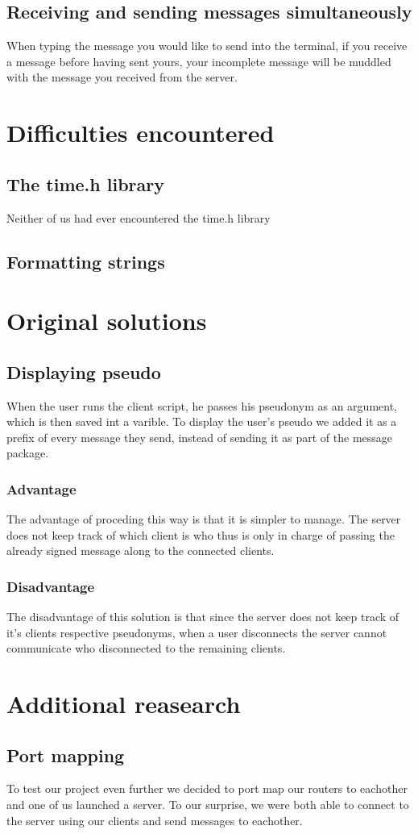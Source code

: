 \documentclass[utf8]{article}
\begin{document}
\subsection{Receiving and sending messages simultaneously}
When typing the message you would like to send into the terminal, if you receive a message before having sent yours, your incomplete message will be muddled with the message you received from the server.

\section{Difficulties encountered}

\subsection{The time.h library}

Neither of us had ever encountered the time.h library

\subsection{Formatting strings}

\newpage

\section{Original solutions}

\subsection{Displaying pseudo}
When the user runs the client script, he passes his pseudonym as an argument, which is then saved int a varible. To display the user's pseudo we added it as a prefix of every message they send, instead of sending it as part of the message package. 

\subsubsection{Advantage}
The advantage of proceding this way is that it is simpler to manage. The server does not keep track of which client is who thus is only in charge of passing the already signed message along to the connected clients.
\subsubsection{Disadvantage}
The disadvantage of this solution is that since the server does not keep track of it's clients respective pseudonyms, when a user disconnects the server cannot communicate who disconnected to the remaining clients.

\section{Additional reasearch}

\subsection{Port mapping}
To test our project even further we decided to port map our routers to eachother and one of us launched a server. To our surprise, we were both able to connect to the server using our clients and send messages to eachother.
\end{document}
